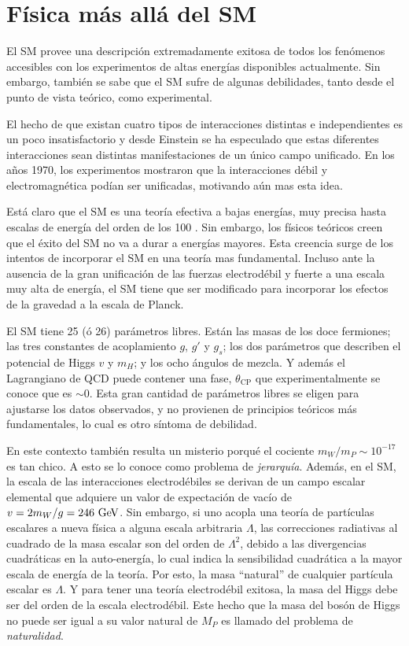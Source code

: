 \section{Física más allá del SM}

El SM provee una descripción extremadamente exitosa de todos los fenómenos
accesibles con los experimentos de altas energías disponibles actualmente.
Sin embargo,
también se sabe que el SM sufre de algunas debilidades, tanto desde el punto de
vista teórico, como experimental.

El hecho de que existan cuatro tipos de interacciones distintas e independientes
es un poco insatisfactorio y desde Einstein se ha especulado que estas
diferentes interacciones sean distintas manifestaciones de un único campo
unificado. En los a\~nos 1970, los experimentos mostraron que la interacciones
débil y electromagnética podían ser unificadas, motivando aún mas esta idea.

Está claro que el SM es una teoría efectiva a bajas energías, muy precisa  hasta
escalas de energía del orden de los 100 {\gev}. Sin embargo, los físicos teóricos creen
que el éxito del SM no va a durar a energías mayores. Esta creencia surge de los
intentos de incorporar el SM en una teoría mas fundamental. Incluso ante la
ausencia de la gran unificación de las fuerzas electrodébil y fuerte a una
escala muy alta de energía, el SM tiene que ser modificado para incorporar los
efectos de la gravedad a la escala de Planck.

El SM tiene 25 (ó 26) parámetros libres. Están las masas de los doce fermiones;
las tres constantes de acoplamiento $g$, $g'$ y $g_s$; los dos parámetros que
describen el potencial de Higgs $v$ y $m_H$; y los ocho ángulos de mezcla. Y
además el Lagrangiano de QCD puede contener una fase, $\theta_{\text{CP}}$ que
experimentalmente se conoce que es $\sim 0$. Esta gran cantidad de parámetros
libres se eligen para ajustarse los datos observados, y no provienen de
principios teóricos más fundamentales, lo cual es otro síntoma de debilidad.

En este contexto también resulta un misterio porqué el cociente $m_W/m_P \sim
10^{-17}$ es tan chico. A esto se lo conoce como problema de \emph{jerarquía}.
Además, en el SM, la escala de las interacciones electrodébiles se derivan de un
campo escalar elemental que adquiere un valor de expectación de vacío de $v = 2
m_W /g = 246 \gev$. Sin embargo, si uno acopla una teoría de partículas
escalares a nueva física a alguna escala arbitraria $\Lambda$, las correcciones
radiativas al cuadrado de la masa escalar son del orden de $\Lambda^2$, debido a
las divergencias cuadráticas en la auto-energía, lo cual indica la sensibilidad
cuadrática a la mayor escala de energía de la teoría. Por esto, la masa
``natural'' de cualquier partícula escalar es $\Lambda$. Y para tener una teoría
electrodébil exitosa, la masa del Higgs debe ser del orden de la escala
electrodébil. Este hecho que la masa del bosón de Higgs no puede ser igual a su
valor natural de $M_P$ es llamado del problema de \emph{naturalidad}.

